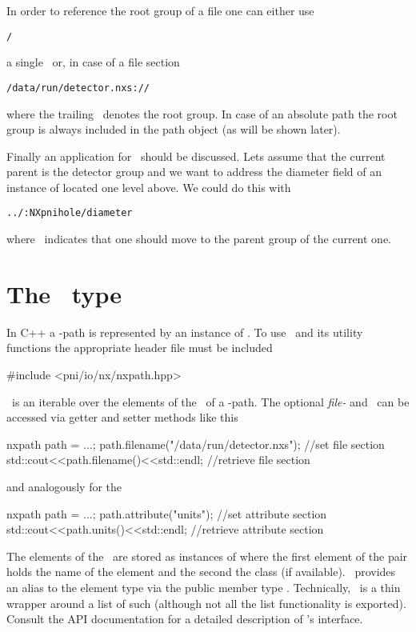 In order to reference the root group of a file one can either use 
\begin{verbatim}
/
\end{verbatim}
a single \osep\ or, in case of a file section
\begin{verbatim}
/data/run/detector.nxs://
\end{verbatim}
where the trailing \fsep\ denotes the root group. In case of an absolute path
the root group is always included in the path object (as will be shown later). 

Finally an application for  \pgroup\ should be discussed. Lets assume that the
current parent is the detector group and we want to address the diameter field
of an instance of  located one level above. We could do this with
\begin{verbatim}
../:NXpnihole/diameter
\end{verbatim}
where \pgroup\ indicates that one should move to the parent group of the 
current one.

\section{The \nxpath\ type}

In C++ a \nexus-path is represented by an instance of \nxpath. 
To use \nxpath\ and its utility functions the appropriate header file must be 
included 
\begin{cppcode}
#include <pni/io/nx/nxpath.hpp>
\end{cppcode}
\nxpath\ is an
iterable over the elements of the \osection\ of a \nexus-path.  
The optional \emph{file-} and \asection\ can be accessed via getter and setter
methods like this
\begin{cppcode}
nxpath path = ...;
path.filename("/data/run/detector.nxs"); //set file section
std::cout<<path.filename()<<std::endl;   //retrieve file section
\end{cppcode}
and analogously for the \asection
\begin{cppcode}
nxpath path = ...;
path.attribute("units");              //set attribute section
std::cout<<path.units()<<std::endl;   //retrieve attribute section
\end{cppcode}

The elements of the \osection\ are stored as instances of 
 where the first element of the pair holds the
name of the element and the second the class (if available). 
\nxpath\ provides an alias to the element type via the public member type
.
Technically, \nxpath\ is a thin wrapper around a list of such
 (although not all the list functionality is exported).
Consult the API documentation for a detailed description of \nxpath's interface.


